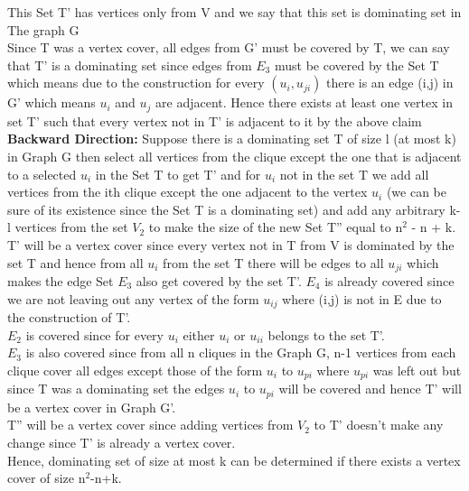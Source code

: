 \documentclass{report}
\begin{document}
 This Set T' has vertices only from V and we say that this set is dominating set in The graph G\\
 Since T was a vertex cover, all edges from G' must be covered by T, we can say that T' is a dominating set since edges from $E_3$ must be covered by the Set T which means due to the construction for every $(u_i,u_{ji})$ there is an edge (i,j) in G' which means $u_i$ and $u_j$ are adjacent.
 Hence there exists at least one vertex in set T' such that every vertex not in T' is adjacent to it by the above claim
 \vspace*{0.25em}\\
 \textbf{Backward Direction:} Suppose there is a dominating set T of size l (at most k) in Graph G then select all vertices from the clique except the one that is adjacent to a selected $u_i$ in the Set T to get T' and for $u_i$ not in the set T we add all vertices from the ith clique except the one adjacent to the vertex $u_i$ (we can be sure of its existence since the Set T is a dominating set) and add any arbitrary k-l vertices from the set $V_2$ to make the size of the new Set T'' equal to n$^2$ - n + k.\\
 T' will be a vertex cover since every vertex not in T from V is dominated by the set T and hence from all $u_i$ from the set T there will be edges to all $u_{ji}$ which makes the edge Set $E_3$ also get covered by the set T'. $E_4 $ is already covered since we are not leaving out any vertex of the form $u_{ij}$ where (i,j) is not in E due to the construction of T'.\\
 $E_2$ is covered since for every $u_i$ either $u_i$ or $u_{ii}$ belongs to the set T'.\\
 $E_3$ is also covered since from all n cliques in the Graph G, n-1 vertices from each clique cover all edges except those of the form $u_i$ to $u_{pi}$ where $u_{pi}$ was left out but since T was a dominating set the edges $u_i$ to $u_{pi}$ will be covered and hence T' will be a vertex cover in Graph G'.\\
 T'' will be a vertex cover since adding vertices from $V_2$ to T' doesn't make any change since T' is already a vertex cover.\vspace*{0.8em}\\
 {\large Hence, dominating set of size at most k can be determined if there exists a vertex cover of size n$^2$-n+k.}
\end{document}
